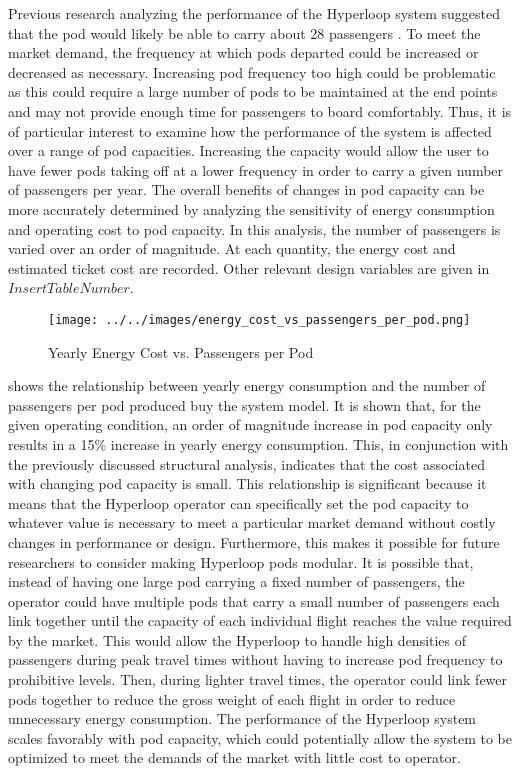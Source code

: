 Previous research analyzing the performance of the Hyperloop system suggested that the pod would likely be able to carry about 28 passengers \cite{Musk}. To meet the market demand, the frequency at which pods departed could be increased or decreased as necessary. Increasing pod frequency too high could be problematic as this could require a large number of pods to be maintained at the end points and may not provide enough time for passengers to board comfortably. Thus, it is of particular interest to examine how the performance of the system is affected over a range of pod capacities. Increasing the capacity would allow the user to have fewer pods taking off at a lower frequency in order to carry a given number of passengers per year. The overall benefits of changes in pod capacity can be more accurately determined by analyzing the sensitivity of energy consumption and operating cost to pod capacity.
In this analysis, the number of passengers is varied over an order of magnitude. At each quantity, the energy cost and estimated ticket cost are recorded. Other relevant design variables are given in $Insert Table Number$.
\begin{figure}
	\centering
	\texttt{[image: ../../images/energy\_cost\_vs\_passengers\_per\_pod.png]}
	\caption{Yearly Energy Cost vs. Passengers per Pod}
	\label{fig:energy_cost_vs_passengers}
\end{figure}
 shows the relationship between yearly energy consumption and the number of passengers per pod produced buy the system model. It is shown that, for the given operating condition, an order of magnitude increase in pod capacity only results in a 15\% increase in yearly energy consumption. This, in conjunction with the previously discussed structural analysis, indicates that the cost associated with changing pod capacity is small. This relationship is significant because it means that the Hyperloop operator can specifically set the pod capacity to whatever value is necessary to meet a particular market demand without costly changes in performance or design. Furthermore, this makes it possible for future researchers to consider making Hyperloop pods modular. It is possible that, instead of having one large pod carrying a fixed number of passengers, the operator could have multiple pods that carry a small number of passengers each link together until the capacity of each individual flight reaches the value required by the market. This would allow the Hyperloop to handle high densities of passengers during peak travel times without having to increase pod frequency to prohibitive levels. Then, during lighter travel times, the operator could link fewer pods together to reduce the gross weight of each flight in order to reduce unnecessary energy consumption. The performance of the Hyperloop system scales favorably with pod capacity, which could potentially allow the system to be optimized to meet the demands of the market with little cost to operator.
